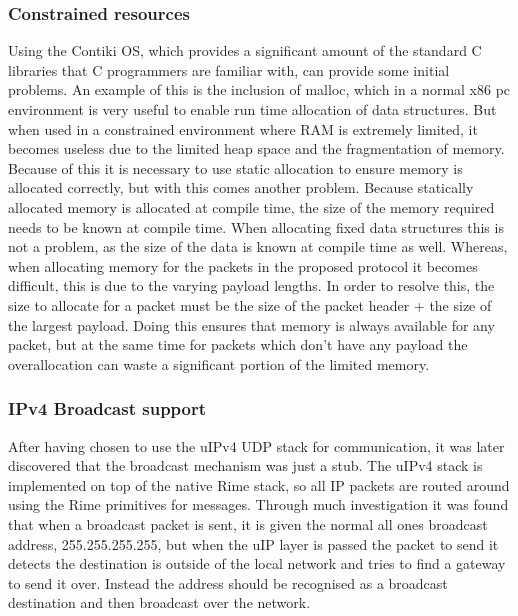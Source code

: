 \subsubsection{Constrained resources} %
\label{ssub:constrained_resources}
Using the Contiki OS, which provides a significant amount of the standard C libraries that C programmers are familiar with, can provide some initial problems. An example of this is the inclusion of malloc, which in a normal x86 pc environment is very useful to enable run time allocation of data structures. But when used in a constrained environment where RAM is extremely limited, it becomes useless due to the limited heap space and the fragmentation of memory. Because of this it is necessary to use static allocation to ensure memory is allocated correctly, but with this comes another problem. Because statically allocated memory is allocated at compile time, the size of the memory required needs to be known at compile time. When allocating fixed data structures this is not a problem, as the size of the data is known at compile time as well. Whereas, when allocating memory for the packets in the proposed protocol it becomes difficult, this is due to the varying payload lengths. In order to resolve this, the size to allocate for a packet must be the size of the packet header + the size of the largest payload. Doing this ensures that memory is always available for any packet, but at the same time for packets which don't have any payload the overallocation can waste a significant portion of the limited memory.  

\subsubsection{IPv4 Broadcast support} %
\label{sub:ipv4_broadcast_support}
After having chosen to use the uIPv4 UDP stack for communication, it was later discovered that the broadcast mechanism was just a stub.
The uIPv4 stack is implemented on top of the native Rime stack, so all IP packets are routed around using the Rime primitives for messages. Through much investigation it was found that when a broadcast packet is sent, it is given the normal all ones broadcast address, 255.255.255.255, but when the uIP layer is passed the packet to send it detects the destination is outside of the local network and tries to find a gateway to send it over. Instead the address should be recognised as a broadcast destination and then broadcast over the network.

